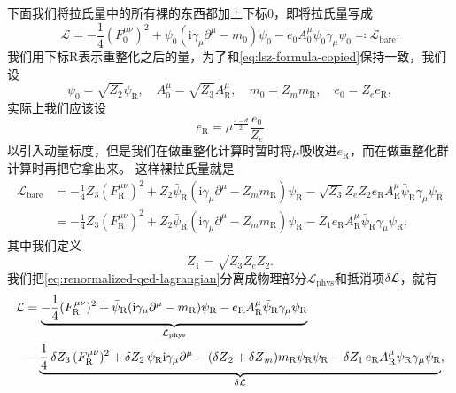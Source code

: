 \documentclass[hyperref, UTF8, a4paper]{ctexart}
\newcommand*{\ii}{\mathrm{i}}
\begin{document}
下面我们将拉氏量中的所有裸的东西都加上下标0，即将拉氏量写成
\begin{equation}
    \mathcal{L} = - \frac{1}{4} (F_0^{\mu \nu})^2 + \bar{\psi}_0 (\ii \gamma_\mu \partial^\mu - m_0) \psi_0  - e_0 A^\mu_0 \bar{\psi}_0 \gamma_\mu \psi_0 \eqqcolon \mathcal{L}_\text{bare}.
\end{equation}
我们用下标R表示重整化之后的量，为了和\eqref{eq:lsz-formula-copied}保持一致，我们设
\begin{equation}
    \psi_0 = \sqrt{Z_2} \psi_\text{R}, \quad A^\mu_0 = \sqrt{Z_3} A^\mu_\text{R}, \quad m_0 = Z_m m_\text{R}, \quad e_0 = Z_e e_\text{R}, 
\end{equation}
实际上我们应该设
\begin{equation}
    e_\text{R} = \mu^{\frac{4-d}{2}} \frac{e_0}{Z_e}
\end{equation}
以引入动量标度，但是我们在做重整化计算时暂时将$\mu$吸收进$e_\text{R}$，而在做重整化群计算时再把它拿出来。
这样裸拉氏量就是
\begin{equation}
    \begin{aligned}
        \mathcal{L}_\text{bare} &= - \frac{1}{4} Z_3 (F_\text{R}^{\mu \nu})^2 + Z_2 \bar{\psi}_\text{R} (\ii \gamma_\mu \partial^\mu - Z_m m_\text{R}) \psi_\text{R}  - \sqrt{Z_3} Z_e Z_2 e_\text{R} A^\mu_\text{R} \bar{\psi}_\text{R} \gamma_\mu \psi_\text{R} \\
        &= - \frac{1}{4} Z_3 (F_\text{R}^{\mu \nu})^2 + Z_2 \bar{\psi}_\text{R} (\ii \gamma_\mu \partial^\mu - Z_m m_\text{R}) \psi_\text{R}  - Z_1 e_\text{R} A^\mu_\text{R} \bar{\psi}_\text{R} \gamma_\mu \psi_\text{R},
    \end{aligned}
    \label{eq:renormalized-qed-lagrangian}
\end{equation}
其中我们定义
\begin{equation}
    Z_1 = \sqrt{Z_3} Z_e Z_2 .
\end{equation}
我们把\eqref{eq:renormalized-qed-lagrangian}分离成物理部分$\mathcal{L}_\text{phys}$和抵消项$\var{\mathcal{L}}$，就有
\begin{equation}
    \begin{aligned}
        \mathcal{L} &= \underbrace{- \frac{1}{4} (F_\text{R}^{\mu \nu})^2 + \bar{\psi}_\text{R} (\ii \gamma_\mu \partial^\mu - m_\text{R}) \psi_\text{R}  - e_\text{R} A^\mu_\text{R} \bar{\psi}_\text{R} \gamma_\mu \psi_\text{R}}_{\mathcal{L}_\text{phys}} \\
        & - \underbrace{\frac{1}{4} \var{Z_3} (F_\text{R}^{\mu \nu})^2 + \var{Z_2} \bar{\psi}_\text{R} \ii \gamma_\mu \partial^\mu - (\var{Z}_2 + \var{Z}_m) m_\text{R} \bar{\psi}_\text{R} \psi_\text{R}  - \var{Z_1} e_\text{R} A^\mu_\text{R} \bar{\psi}_\text{R} \gamma_\mu \psi_\text{R}}_{\var{\mathcal{L}}},
    \end{aligned}
    \label{eq:separated-qed-lagrangian}
\end{equation}
\end{document}
